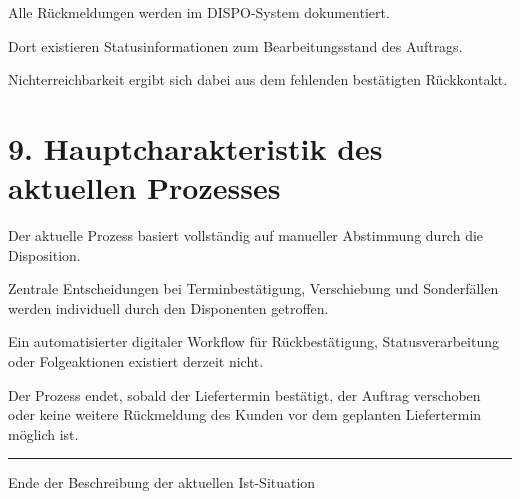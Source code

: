 \documentclass[a4paper,11pt]{article}
\begin{document}
	Alle Rückmeldungen werden im DISPO-System dokumentiert.
	
	Dort existieren Statusinformationen zum Bearbeitungsstand des Auftrags.
	
	Nichterreichbarkeit ergibt sich dabei aus dem fehlenden bestätigten Rückkontakt.
	
	\section*{9. Hauptcharakteristik des aktuellen Prozesses}
	
	Der aktuelle Prozess basiert vollständig auf manueller Abstimmung durch die
	Disposition.
	
	Zentrale Entscheidungen bei Terminbestätigung, Verschiebung und Sonderfällen
	werden individuell durch den Disponenten getroffen.
	
	Ein automatisierter digitaler Workflow für Rückbestätigung, Statusverarbeitung
	oder Folgeaktionen existiert derzeit nicht.
	
	Der Prozess endet, sobald der Liefertermin bestätigt, der Auftrag verschoben oder keine weitere Rückmeldung des Kunden vor dem geplanten Liefertermin möglich ist.
	\vfill
	
	\begin{center}
		\rule{0.6\textwidth}{0.4pt}
		
		\vspace{0.2cm}
		
		{\small Ende der Beschreibung der aktuellen Ist-Situation}
	\end{center}
	
\end{document}
